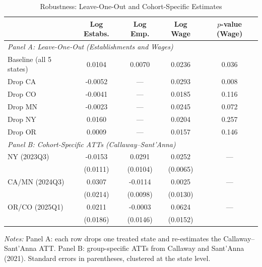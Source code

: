 \begin{table}[H]
\centering
\caption{Robustness: Leave-One-Out and Cohort-Specific Estimates}
\label{tab:robust}
\begin{threeparttable}
\begin{tabular}{lcccc}
\toprule
 & Log Estabs. & Log Emp. & Log Wage & $p$-value (Wage) \\
\midrule
\multicolumn{5}{l}{\textit{Panel A: Leave-One-Out (Establishments and Wages)}} \\[0.3em]
Baseline (all 5 states) & 0.0104 & 0.0070 & 0.0236 & 0.036 \\
Drop CA & -0.0052 & --- & 0.0293 & 0.008 \\
Drop CO & -0.0041 & --- & 0.0185 & 0.116 \\
Drop MN & -0.0023 & --- & 0.0245 & 0.072 \\
Drop NY & 0.0160 & --- & 0.0204 & 0.257 \\
Drop OR & 0.0009 & --- & 0.0157 & 0.146 \\
\midrule
\multicolumn{5}{l}{\textit{Panel B: Cohort-Specific ATTs (Callaway--Sant'Anna)}} \\[0.3em]
NY (2023Q3) & -0.0153 & 0.0291 & 0.0252 & --- \\
 & (0.0111) & (0.0104) & (0.0065) & \\
CA/MN (2024Q3) & 0.0307 & -0.0114 & 0.0025 & --- \\
 & (0.0214) & (0.0098) & (0.0130) & \\
OR/CO (2025Q1) & 0.0211 & -0.0003 & 0.0624 & --- \\
 & (0.0186) & (0.0146) & (0.0152) & \\
\bottomrule
\end{tabular}
\begin{tablenotes}[flushleft]
\small
\item \textit{Notes:} Panel A: each row drops one treated state and re-estimates the Callaway--Sant'Anna ATT. Panel B: group-specific ATTs from Callaway and Sant'Anna (2021). Standard errors in parentheses, clustered at the state level.
\end{tablenotes}
\end{threeparttable}
\end{table}
